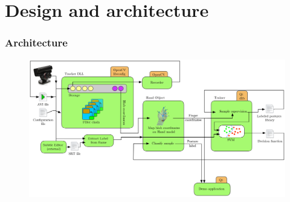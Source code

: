 \documentclass{beamer}
\begin{document}
	\section{Design and architecture}
	\begin{frame}
		\frametitle{Architecture}
		\begin{figure}
			\hspace*{-2cm}
			\includegraphics[width=1.3\textwidth]{images/arch} 
		\end{figure}
	\end{frame}
\end{document}
